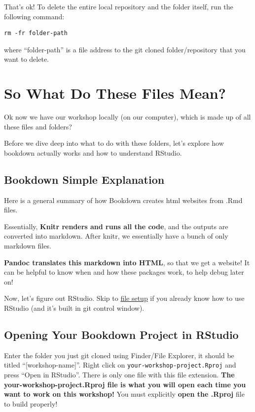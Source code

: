 \documentclass[
]{book}
\theoremstyle{definition}
\theoremstyle{definition}
\theoremstyle{definition}
\theoremstyle{definition}
\theoremstyle{remark}
\begin{document}
That's ok! To delete the entire local repository and the folder itself, run the following command:

\begin{verbatim}
rm -fr folder-path
\end{verbatim}

where ``folder-path'' is a file address to the git cloned folder/repository that you want to delete.

\chapter{So What Do These Files Mean?}\label{file-explanation}

Ok now we have our workshop locally (on our computer), which is made up of all these files and folders?

Before we dive deep into what to do with these folders, let's explore how bookdown actually works and how to understand RStudio.

\section{Bookdown Simple Explanation}\label{bookdown-simple-explanation}

Here is a general summary of how Bookdown creates html websites from .Rmd files.

Essentially, \textbf{Knitr renders and runs all the code}, and the outputs are converted into markdown. After knitr, we essentially have a bunch of only markdown files.

\textbf{Pandoc translates this markdown into HTML}, so that we get a website! It can be helpful to know when and how these packages work, to help debug later on!

Now, let's figure out RStudio. Skip to \hyperref[file-setup]{file setup} if you already know how to use RStudio (and it's built in git control window).

\section{Opening Your Bookdown Project in RStudio}\label{opening-your-bookdown-project-in-rstudio}

Enter the folder you just git cloned using Finder/File Explorer, it should be titled ``{[}workshop-name{]}''. Right click on \texttt{your-workshop-project.Rproj} and press ``Open in RStudio''. There is only one file with this file extension. \textbf{The your-workshop-project.Rproj file is what you will open each time you want to work on this workshop!} You must explicitly \textbf{open the .Rproj} file to build properly!
\end{document}
